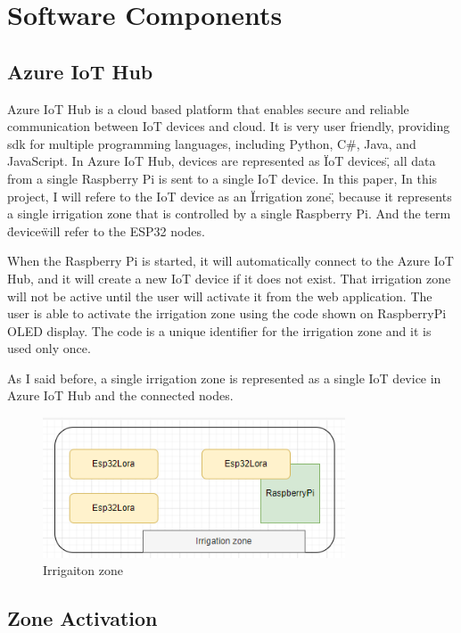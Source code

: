 \section{Software Components}
\subsection{Azure IoT Hub}
Azure IoT Hub is a cloud based platform
that enables secure and reliable communication between IoT devices and cloud.
It is very user friendly, providing sdk for multiple programming languages, 
including Python, C\#, Java, and JavaScript. 
In Azure IoT Hub, 
devices are represented as \"IoT devices\", all data from a single Raspberry Pi is sent
to a single IoT device. In this paper, In this project, I will refere to the IoT device
as an \"Irrigation zone\", because it represents a single irrigation zone that is 
controlled by a single Raspberry Pi. And the term \"device\" will refer to the ESP32 nodes.

When the Raspberry Pi is started, it will automatically connect to the Azure IoT Hub,
and it will create a new IoT device if it does not exist. That irrigation zone will not be active
until the user will activate it from the web application. The user is able to
activate the irrigation zone using the code shown on RaspberryPi OLED display.
The code is a unique identifier for the irrigation zone and it is used only once.

As I said before, a single irrigation zone is represented as a single 
IoT device in Azure IoT Hub and the connected nodes. 
\begin{figure}[H]
    \centering
    \includegraphics[width=0.8\textwidth]{images/irrigation-zone.png}
    \caption{Irrigaiton zone}
    \label{fig:irrigation-zone}
\end{figure}

\subsection{Zone Activation}

